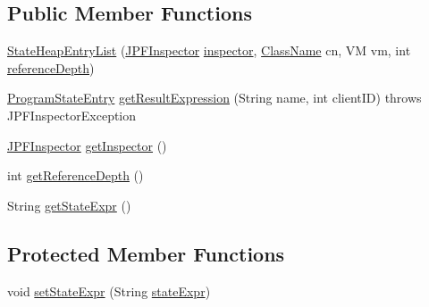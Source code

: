 \subsection*{Public Member Functions}
\begin{DoxyCompactItemize}
\item 
\hyperlink{classgov_1_1nasa_1_1jpf_1_1inspector_1_1server_1_1programstate_1_1_state_heap_entry_list_a728a342bcbe3c2d529d03c8adffcfdac}{State\+Heap\+Entry\+List} (\hyperlink{classgov_1_1nasa_1_1jpf_1_1inspector_1_1server_1_1jpf_1_1_j_p_f_inspector}{J\+P\+F\+Inspector} \hyperlink{classgov_1_1nasa_1_1jpf_1_1inspector_1_1server_1_1programstate_1_1_state_node_a26561849632450a4deb53e38716d93c6}{inspector}, \hyperlink{classgov_1_1nasa_1_1jpf_1_1inspector_1_1utils_1_1expressions_1_1_class_name}{Class\+Name} cn, VM vm, int \hyperlink{classgov_1_1nasa_1_1jpf_1_1inspector_1_1server_1_1programstate_1_1_state_node_a55683618625dae46e8aa68d95811d6bb}{reference\+Depth})
\item 
\hyperlink{classgov_1_1nasa_1_1jpf_1_1inspector_1_1common_1_1pse_1_1_program_state_entry}{Program\+State\+Entry} \hyperlink{classgov_1_1nasa_1_1jpf_1_1inspector_1_1server_1_1programstate_1_1_state_heap_entry_list_a150de1c82e17a9a8f9a05e0d1a343d1e}{get\+Result\+Expression} (String name, int client\+ID)  throws J\+P\+F\+Inspector\+Exception 
\item 
\hyperlink{classgov_1_1nasa_1_1jpf_1_1inspector_1_1server_1_1jpf_1_1_j_p_f_inspector}{J\+P\+F\+Inspector} \hyperlink{classgov_1_1nasa_1_1jpf_1_1inspector_1_1server_1_1programstate_1_1_state_node_af07846313e0632df18008b5bf571f805}{get\+Inspector} ()
\item 
int \hyperlink{classgov_1_1nasa_1_1jpf_1_1inspector_1_1server_1_1programstate_1_1_state_node_af59b1ac0319251e657293c810a16cdd9}{get\+Reference\+Depth} ()
\item 
String \hyperlink{classgov_1_1nasa_1_1jpf_1_1inspector_1_1server_1_1programstate_1_1_state_node_a54c1c8d91f93c078171589f844252bdf}{get\+State\+Expr} ()
\end{DoxyCompactItemize}
\subsection*{Protected Member Functions}
\begin{DoxyCompactItemize}
\item 
void \hyperlink{classgov_1_1nasa_1_1jpf_1_1inspector_1_1server_1_1programstate_1_1_state_node_a7ed75cc4ba543123c95e506db6f7b84c}{set\+State\+Expr} (String \hyperlink{classgov_1_1nasa_1_1jpf_1_1inspector_1_1server_1_1programstate_1_1_state_node_a784a38d8edeb54f871891cb63de85585}{state\+Expr})
\end{DoxyCompactItemize}
